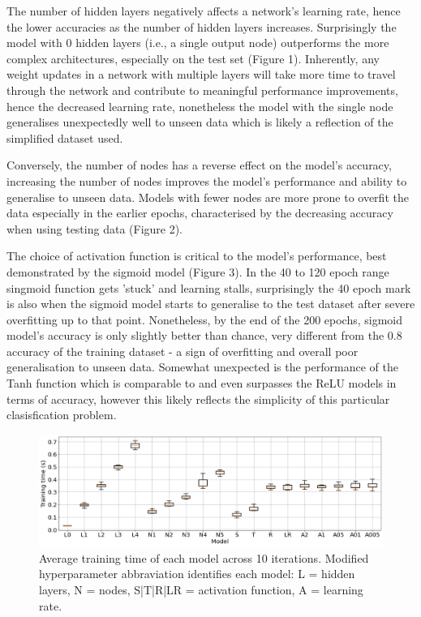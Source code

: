 \documentclass{article}
\begin{document}
The number of hidden layers negatively affects a network's learning rate, hence the lower accuracies as the number of hidden layers increases. Surprisingly the model with 0 hidden layers (i.e., a single output node) outperforms the more complex architectures, especially on the test set (Figure 1). Inherently, any weight updates in a network with multiple layers will take more time to travel through the network and contribute to meaningful performance improvements, hence the decreased learning rate, nonetheless the model with the single node generalises unexpectedly well to unseen data which is likely a reflection of the simplified dataset used.

Conversely, the number of nodes has a reverse effect on the model's accuracy, increasing the number of  nodes improves the model's performance and ability to generalise to unseen data. Models with fewer nodes are more prone to overfit the data especially in the earlier epochs, characterised by the decreasing accuracy when using testing data (Figure 2).

The choice of activation function is critical to the model's performance, best demonstrated by the sigmoid model (Figure 3). In the 40 to 120 epoch range singmoid function gets 'stuck' and learning stalls, surprisingly the 40 epoch mark is also when the sigmoid model starts to generalise to the test dataset after severe overfitting up to that point. Nonetheless, by the end of  the 200 epochs, sigmoid model's accuracy is only slightly better than chance, very different from the 0.8 accuracy of the training dataset - a sign of overfitting and overall poor generalisation to unseen data.
Somewhat unexpected is the performance of the Tanh function which is comparable to and even surpasses the ReLU models in terms of accuracy, however this likely reflects the simplicity of this particular clasisfication problem. 

\begin{figure}[H]
  \centering
  \includegraphics[width=\textwidth]{figs/times.png}
  \caption{
    Average training time of each model across 10 iterations.
    Modified hyperparameter abbraviation identifies each model:
    L = hidden layers, N = nodes, S|T|R|LR = activation function,
    A = learning rate.
  }
  \label{fig:times}
\end{figure}
\end{document}
